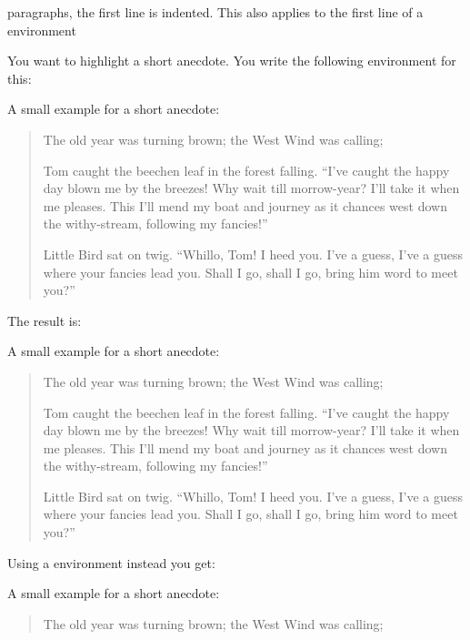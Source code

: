      paragraphs, the first line is indented. This also
    applies to the first line of a 
    environment%
  \fi %
    \begin{Example}
      You want to highlight a short anecdote. You write the following
       environment for this:%
\begin{lstcode}
  A small example for a short anecdote:
  \begin{quotation}
    The old year was turning brown; the West Wind was
    calling;
        
    Tom caught the beechen leaf in the forest falling.
    ``I've caught the happy day blown me by the breezes!
    Why wait till morrow-year? I'll take it when me pleases.
    This I'll mend my boat and journey as it chances
    west down the withy-stream, following my fancies!''
    
    Little Bird sat on twig. ``Whillo, Tom! I heed you.
    I've a guess, I've a guess where your fancies lead you.
    Shall I go, shall I go, bring him word to meet you?''
  \end{quotation}
\end{lstcode}
      The result is:
      \begin{ShowOutput}
        A small example for a short anecdote:
        \begin{quotation}
          The old year was turning brown; the West Wind was
          calling;

          Tom caught the beechen leaf in the forest falling.
          ``I've caught the happy day blown me by the breezes!
          Why wait till morrow-year? I'll take it when me pleases.
          This I'll mend my boat and journey as it chances
          west down the withy-stream, following my fancies!''

          Little Bird sat on twig. ``Whillo, Tom! I heed you.
          I've a guess, I've a guess where your fancies lead you.
          Shall I go, shall I go, bring him word to meet you?''
        \end{quotation}
      \end{ShowOutput}
      Using a  environment instead you get:
      \begin{ShowOutput}
        A small example for a short anecdote:
        \begin{quote}\setlength{\parskip}{4pt plus 2pt minus 2pt}
          The old year was turning brown; the West Wind was
          calling;


\end{quote}
\end{ShowOutput}
\end{Example}
